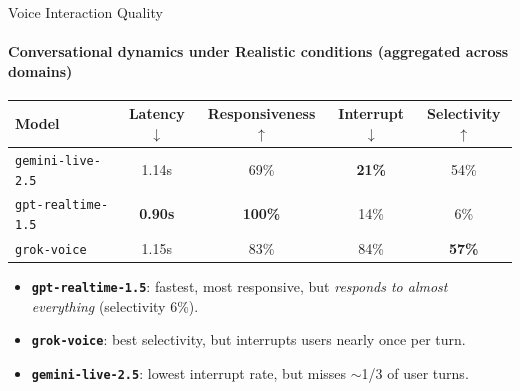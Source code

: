 \documentclass[aspectratio=169]{beamer}
\begin{document}

\begin{frame}{Voice Interaction Quality}
  \framesubtitle{Conversational dynamics under Realistic conditions (aggregated across domains)}

  \vspace{0.3em}
  \begin{center}
  \begin{small}
  \begin{tabular}{@{}lcccc@{}}
    \toprule
    \textbf{Model} & \textbf{Latency}$\downarrow$ & \textbf{Responsiveness}$\uparrow$ & \textbf{Interrupt}$\downarrow$ & \textbf{Selectivity}$\uparrow$ \\
    \midrule
    \texttt{gemini-live-2.5}    & 1.14s          & 69\%           & \textbf{21\%}  & 54\% \\
    \texttt{gpt-realtime-1.5}   & \textbf{0.90s} & \textbf{100\%} & 14\%           & 6\% \\
    \texttt{grok-voice}         & 1.15s          & 83\%           & 84\%           & \textbf{57\%} \\
    \bottomrule
  \end{tabular}
  \end{small}
  \end{center}

  \vspace{0.6em}
  \begin{itemize}
    \item \textbf{\texttt{gpt-realtime-1.5}}: fastest, most responsive, but \emph{responds to almost everything} (selectivity 6\%).
    \item \textbf{\texttt{grok-voice}}: best selectivity, but interrupts users nearly once per turn.
    \item \textbf{\texttt{gemini-live-2.5}}: lowest interrupt rate, but misses $\sim$1/3 of user turns.
  \end{itemize}

  \vspace{0.4em}
  \textcolor{SierraOrange}{}

\end{frame}

\end{document}
